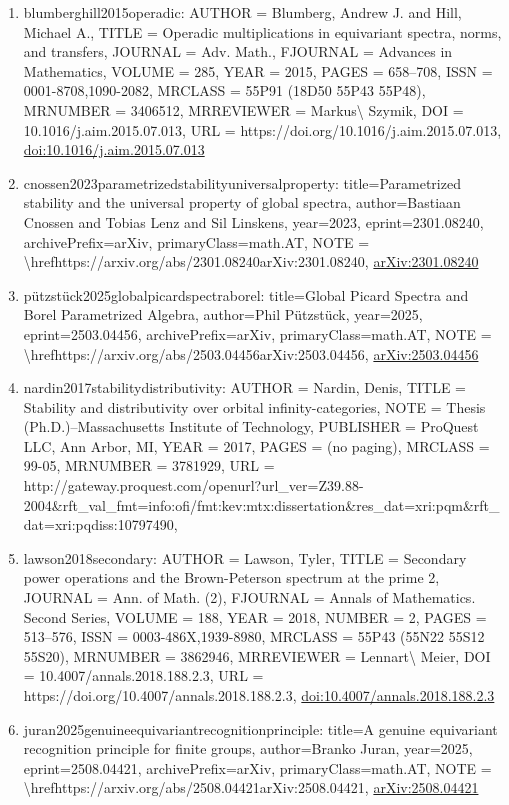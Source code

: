 \documentclass[11pt]{article}
\begin{document}
\begin{enumerate}[leftmargin=*]
  \item blumberghill2015operadic: AUTHOR = Blumberg, Andrew J. and Hill, Michael A., TITLE = Operadic multiplications in equivariant spectra, norms, and transfers, JOURNAL = Adv. Math., FJOURNAL = Advances in Mathematics, VOLUME = 285, YEAR = 2015, PAGES = 658--708, ISSN = 0001-8708,1090-2082, MRCLASS = 55P91 (18D50 55P43 55P48), MRNUMBER = 3406512, MRREVIEWER = Markus\textbackslash{} Szymik, DOI = 10.1016/j.aim.2015.07.013, URL = https://doi.org/10.1016/j.aim.2015.07.013, \href{https://doi.org/10.1016/j.aim.2015.07.013}{doi:10.1016/j.aim.2015.07.013}
  \item cnossen2023parametrizedstabilityuniversalproperty: title=Parametrized stability and the universal property of global spectra, author=Bastiaan Cnossen and Tobias Lenz and Sil Linskens, year=2023, eprint=2301.08240, archivePrefix=arXiv, primaryClass=math.AT, NOTE = \textbackslash{}hrefhttps://arxiv.org/abs/2301.08240arXiv:2301.08240, \href{https://arxiv.org/abs/2301.08240}{arXiv:2301.08240}
  \item pützstück2025globalpicardspectraborel: title=Global Picard Spectra and Borel Parametrized Algebra, author=Phil Pützstück, year=2025, eprint=2503.04456, archivePrefix=arXiv, primaryClass=math.AT, NOTE = \textbackslash{}hrefhttps://arxiv.org/abs/2503.04456arXiv:2503.04456, \href{https://arxiv.org/abs/2503.04456}{arXiv:2503.04456}
  \item nardin2017stabilitydistributivity: AUTHOR = Nardin, Denis, TITLE = Stability and distributivity over orbital infinity-categories, NOTE = Thesis (Ph.D.)--Massachusetts Institute of Technology, PUBLISHER = ProQuest LLC, Ann Arbor, MI, YEAR = 2017, PAGES = (no paging), MRCLASS = 99-05, MRNUMBER = 3781929, URL = http://gateway.proquest.com/openurl?url\_ver=Z39.88-2004\&rft\_val\_fmt=info:ofi/fmt:kev:mtx:dissertation\&res\_dat=xri:pqm\&rft\_dat=xri:pqdiss:10797490,
  \item lawson2018secondary: AUTHOR = Lawson, Tyler, TITLE = Secondary power operations and the Brown-Peterson spectrum at the prime 2, JOURNAL = Ann. of Math. (2), FJOURNAL = Annals of Mathematics. Second Series, VOLUME = 188, YEAR = 2018, NUMBER = 2, PAGES = 513--576, ISSN = 0003-486X,1939-8980, MRCLASS = 55P43 (55N22 55S12 55S20), MRNUMBER = 3862946, MRREVIEWER = Lennart\textbackslash{} Meier, DOI = 10.4007/annals.2018.188.2.3, URL = https://doi.org/10.4007/annals.2018.188.2.3, \href{https://doi.org/10.4007/annals.2018.188.2.3}{doi:10.4007/annals.2018.188.2.3}
  \item juran2025genuineequivariantrecognitionprinciple: title=A genuine equivariant recognition principle for finite groups, author=Branko Juran, year=2025, eprint=2508.04421, archivePrefix=arXiv, primaryClass=math.AT, NOTE = \textbackslash{}hrefhttps://arxiv.org/abs/2508.04421arXiv:2508.04421, \href{https://arxiv.org/abs/2508.04421}{arXiv:2508.04421}

\end{enumerate}
\end{document}
